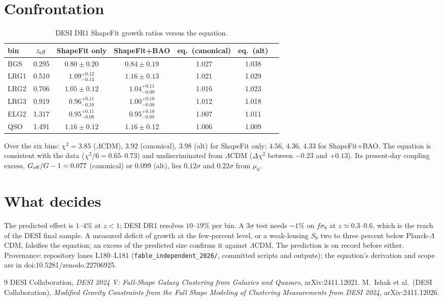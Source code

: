 \documentclass[11pt,letterpaper]{article}
\begin{document}
\section{Confrontation}
\begin{table}[h]\centering\caption{DESI DR1 ShapeFit growth ratios versus the equation.}\label{t}
\begin{tabular}{lcccccc}\toprule
bin & $z_{\rm eff}$ & ShapeFit only & ShapeFit+BAO & eq.\ (canonical) & eq.\ (alt) \\\midrule
BGS & 0.295 & $0.80\pm0.20$ & $0.84\pm0.19$ & 1.027 & 1.038\\
LRG1 & 0.510 & $1.09^{+0.12}_{-0.14}$ & $1.16\pm0.13$ & 1.021 & 1.029\\
LRG2 & 0.706 & $1.05\pm0.12$ & $1.04^{+0.11}_{-0.09}$ & 1.016 & 1.023\\
LRG3 & 0.919 & $0.96^{+0.11}_{-0.10}$ & $1.00^{+0.10}_{-0.08}$ & 1.012 & 1.018\\
ELG2 & 1.317 & $0.95^{+0.11}_{-0.08}$ & $0.95^{+0.10}_{-0.08}$ & 1.007 & 1.011\\
QSO & 1.491 & $1.16\pm0.12$ & $1.16\pm0.12$ & 1.006 & 1.009\\\bottomrule
\end{tabular}\end{table}
Over the six bins: $\chi^2=3.85$ ($\Lambda$CDM), $3.92$ (canonical), $3.98$ (alt) for ShapeFit only; $4.56$, $4.36$, $4.33$ for ShapeFit+BAO. The equation is consistent with the data ($\chi^2/6=0.65$--$0.73$) and undiscriminated from $\Lambda$CDM ($\Delta\chi^2$ between $-0.23$ and $+0.13$). Its present-day coupling excess, $G_{\rm eff}/G-1=0.077$ (canonical) or $0.099$ (alt), lies $0.12\sigma$ and $0.22\sigma$ from $\mu_0$.
\section{What decides}
The predicted effect is $1$--$4\%$ at $z<1$; DESI DR1 resolves $10$--$19\%$ per bin. A $3\sigma$ test needs $\sim1\%$ on $f\sigma_8$ at $z\simeq0.3$--$0.6$, which is the reach of the DESI final sample. A measured deficit of growth at the few-percent level, or a weak-lensing $S_8$ two to three percent below Planck-$\Lambda$CDM, falsifies the equation; an excess of the predicted size confirms it against $\Lambda$CDM. The prediction is on record before either. Provenance: repository lanes L180--L181 (\texttt{fable\_independent\_2026/}, committed scripts and outputs); the equation's derivation and scope are in doi:10.5281/zenodo.22706925.
\begin{thebibliography}{9}
 DESI Collaboration, \emph{DESI 2024 V: Full-Shape Galaxy Clustering from Galaxies and Quasars}, arXiv:2411.12021.
 M.~Ishak et al.\ (DESI Collaboration), \emph{Modified Gravity Constraints from the Full Shape Modeling of Clustering Measurements from DESI 2024}, arXiv:2411.12026.
\end{thebibliography}
\end{document}
